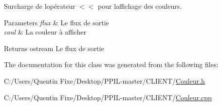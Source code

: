 Surcharge de l\textquotesingle{}opérateur $<$$<$ pour l\textquotesingle{}affichage des couleurs. 


\begin{DoxyParams}{Parameters}
{\em flux} & Le flux de sortie \\
\hline
{\em coul} & La couleur à afficher \\
\hline
\end{DoxyParams}
\begin{DoxyReturn}{Returns}
ostream Le flux de sortie 
\end{DoxyReturn}


The documentation for this class was generated from the following files\+:\begin{DoxyCompactItemize}
\item 
C\+:/\+Users/\+Quentin Fixe/\+Desktop/\+P\+P\+I\+L-\/master/\+C\+L\+I\+E\+N\+T/\hyperlink{_couleur_8h}{Couleur.\+h}\item 
C\+:/\+Users/\+Quentin Fixe/\+Desktop/\+P\+P\+I\+L-\/master/\+C\+L\+I\+E\+N\+T/\hyperlink{_couleur_8cpp}{Couleur.\+cpp}\end{DoxyCompactItemize}
